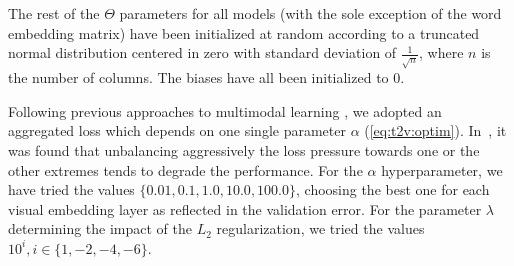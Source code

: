 The rest of the $\Theta$ parameters for all models (with the sole exception of the word embedding matrix) have been initialized at random according to a truncated normal distribution centered in zero with standard deviation of $\frac{1}{\sqrt{n}}$, where $n$ is the number of columns.
The biases have all been initialized to 0.

Following previous approaches to multimodal learning \cite{feng2014cross,ngiam2011multimodal}, we adopted an aggregated loss which depends on one single parameter $\alpha$ (\ref{eq:t2v:optim}).
In~\cite{feng2014cross}, it was found that unbalancing aggressively the loss pressure towards one or the other extremes tends to degrade the performance.
For the $\alpha$ hyperparameter, we have tried the values $\{0.01, 0.1, 1.0, 10.0, 100.0\}$, choosing the best one for each visual embedding layer as reflected in the validation error.
For the parameter $\lambda$ determining the impact of the $L_2$ regularization, we tried the values $10^i, i\in\{1,-2,-4,-6\}$.


